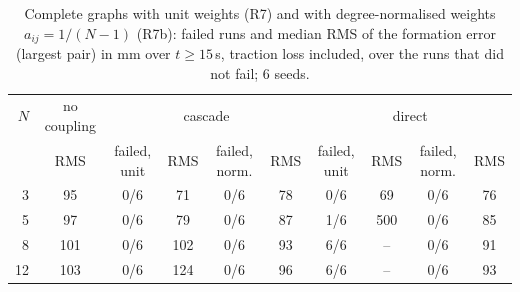 \begin{table}[htbp]\centering\small
\caption{Complete graphs with unit weights (R7) and with degree-normalised weights $a_{ij}=1/(N-1)$ (R7b): failed runs and median RMS of the formation error (largest pair) in mm over $t\ge15$\,s, traction loss included, over the runs that did not fail; 6 seeds.}\label{tab:r7b}
\begin{adjustbox}{max width=\linewidth}
\begin{tabular}{@{}rccccccccc@{}}\toprule
$N$ & no coupling & \multicolumn{4}{c}{cascade} & \multicolumn{4}{c}{direct}\\\cmidrule(lr){3-6}\cmidrule(lr){7-10} & RMS & failed, unit & RMS & failed, norm. & RMS & failed, unit & RMS & failed, norm. & RMS\\\midrule
3 & 95 & 0/6 & 71 & 0/6 & 78 & 0/6 & 69 & 0/6 & 76\\
5 & 97 & 0/6 & 79 & 0/6 & 87 & 1/6 & 500 & 0/6 & 85\\
8 & 101 & 0/6 & 102 & 0/6 & 93 & 6/6 & -- & 0/6 & 91\\
12 & 103 & 0/6 & 124 & 0/6 & 96 & 6/6 & -- & 0/6 & 93\\
\bottomrule\end{tabular}
\end{adjustbox}
\end{table}
